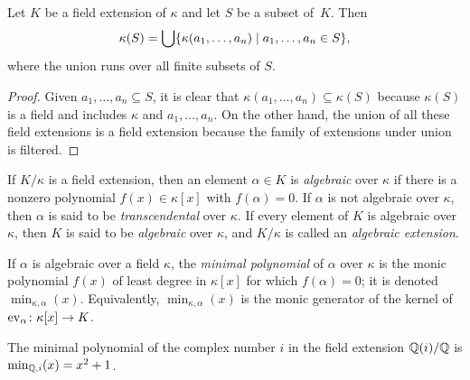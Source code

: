 \begin{prop}\label{prop:finite-filtered-union}
    Let\/ $K$ be a field extension of\/ $\kappa$ and let\/ $S$ be a subset of\/~$K$. Then
    $$
        \kappa(S) = \bigcup
            \{\kappa(a_1,\dots,a_n)\mid a_1,\dots, a_n\in S\},
    $$
    where the union runs over all finite subsets of\/ $S$.
\end{prop}

\begin{proof}
    Given ${a_1,\dots,a_n}\subseteq S$, it is clear that $\kappa(a_1,\dots,a_n)\subseteq\kappa(S)$ because $\kappa(S)$ is a field and includes $\kappa$ and $a_1,\dots,a_n$. On the other hand, the union of all these field extensions is a field extension because the family of extensions under union is filtered.
\end{proof}

\begin{defns}
    If $K/\kappa$ is a field extension, then an element $\alpha \in K$ is \textsl{algebraic} over $\kappa$ if there is a nonzero polynomial $f(x) \in \kappa[x]$ with $f(\alpha)=0$. If $\alpha$ is not algebraic over $\kappa$, then $\alpha$ is said to be \textsl{transcendental} over $\kappa$. If every element of $K$ is algebraic over $\kappa$, then $K$ is said to be \textsl{algebraic} over $\kappa$, and $K / \kappa$ is called an \textsl{algebraic extension}.
\end{defns}

\begin{defn}
    If $\alpha$ is algebraic over a field $\kappa$, the \textsl{minimal polynomial} of $\alpha$ over $\kappa$ is the monic polynomial $f(x)$ of least degree in $\kappa[x]$ for which $f(\alpha)=0$; it is denoted $\min_{\kappa,\alpha}(x)$. Equivalently, $\min_{\kappa,\alpha}(x)$ is the monic generator of the kernel of ${\rm ev}_{\alpha}\colon\kappa[x]\to K$.
\end{defn}

\begin{xmpl}
    The minimal polynomial of the complex number $i$ in the field extension $\mathbb{Q}(i)/\mathbb{Q}$ is $\min_{\mathbb{Q},i}(x) = x^2+1$.
\end{xmpl}

